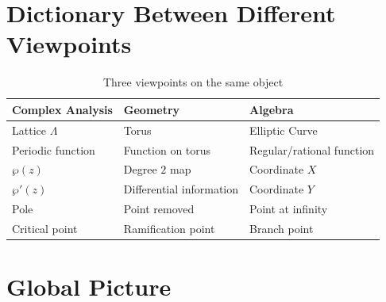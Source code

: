 \documentclass[12pt,a4paper]{article}
\theoremstyle{notespace}
\begin{document}
\section{Dictionary Between Different Viewpoints}

\begin{table}[h]
	\centering
	\begin{tabular}{|l|l|l|}
		\hline
		Complex Analysis & Geometry & Algebra \\ \hline
		
		Lattice \(\Lambda\)
		&
		Torus
		&
		Elliptic Curve
		\\ \hline
		
		Periodic function
		&
		Function on torus
		&
		Regular/rational function
		\\ \hline
		
		\(\wp(z)\)
		&
		Degree \(2\) map
		&
		Coordinate \(X\)
		\\ \hline
		
		\(\wp'(z)\)
		&
		Differential information
		&
		Coordinate \(Y\)
		\\ \hline
		
		Pole
		&
		Point removed
		&
		Point at infinity
		\\ \hline
		
		Critical point
		&
		Ramification point
		&
		Branch point
		\\ \hline
		
	\end{tabular}
	\caption{Three viewpoints on the same object}
\end{table}
\section{Global Picture}

\begin{center}
\end{center}
\end{document}
